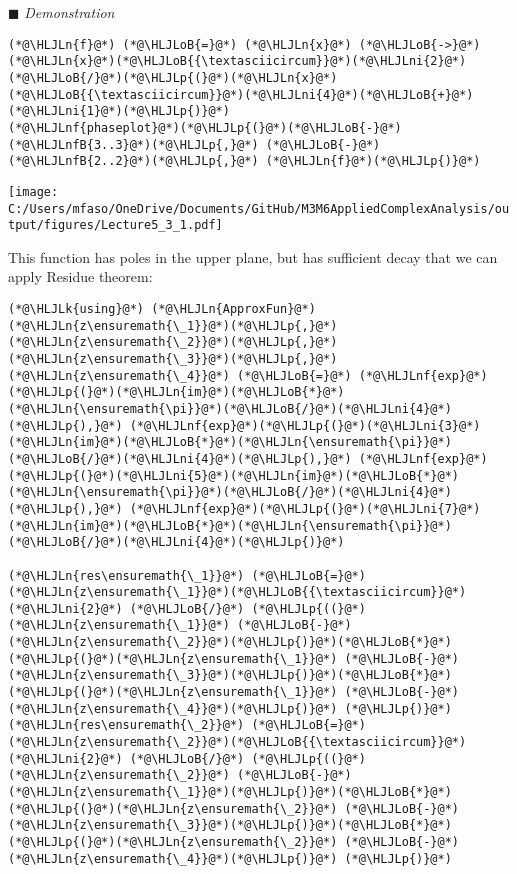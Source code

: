 \documentclass[12pt,landscape]{article}
\newcommand{\HLJLk}[1]{\textcolor[RGB]{148,91,176}{\textbf{#1}}}
\newcommand{\HLJLn}[1]{#1}
\newcommand{\HLJLnf}[1]{\textcolor[RGB]{66,102,213}{#1}}
\newcommand{\HLJLnfB}[1]{\textcolor[RGB]{59,151,46}{#1}}
\newcommand{\HLJLni}[1]{\textcolor[RGB]{59,151,46}{#1}}
\newcommand{\HLJLoB}[1]{\textcolor[RGB]{102,102,102}{\textbf{#1}}}
\newcommand{\HLJLp}[1]{#1}
\def\cent#1{\begin{center}#1\end{center} }
\begin{document}
{\ensuremath{\blacksquare}
\newpage
\emph{Demonstration}


\begin{lstlisting}
(*@\HLJLn{f}@*) (*@\HLJLoB{=}@*) (*@\HLJLn{x}@*) (*@\HLJLoB{->}@*) (*@\HLJLn{x}@*)(*@\HLJLoB{{\textasciicircum}}@*)(*@\HLJLni{2}@*)(*@\HLJLoB{/}@*)(*@\HLJLp{(}@*)(*@\HLJLn{x}@*)(*@\HLJLoB{{\textasciicircum}}@*)(*@\HLJLni{4}@*)(*@\HLJLoB{+}@*)(*@\HLJLni{1}@*)(*@\HLJLp{)}@*)
(*@\HLJLnf{phaseplot}@*)(*@\HLJLp{(}@*)(*@\HLJLoB{-}@*)(*@\HLJLnfB{3..3}@*)(*@\HLJLp{,}@*) (*@\HLJLoB{-}@*)(*@\HLJLnfB{2..2}@*)(*@\HLJLp{,}@*) (*@\HLJLn{f}@*)(*@\HLJLp{)}@*)
\end{lstlisting}

\cent{\texttt{[image: C:/Users/mfaso/OneDrive/Documents/GitHub/M3M6AppliedComplexAnalysis/output/figures/Lecture5\_3\_1.pdf]}}

This function has poles in the upper plane, but has sufficient decay that we can apply Residue theorem:


\begin{lstlisting}
(*@\HLJLk{using}@*) (*@\HLJLn{ApproxFun}@*)
(*@\HLJLn{z\ensuremath{\_1}}@*)(*@\HLJLp{,}@*)(*@\HLJLn{z\ensuremath{\_2}}@*)(*@\HLJLp{,}@*)(*@\HLJLn{z\ensuremath{\_3}}@*)(*@\HLJLp{,}@*)(*@\HLJLn{z\ensuremath{\_4}}@*) (*@\HLJLoB{=}@*) (*@\HLJLnf{exp}@*)(*@\HLJLp{(}@*)(*@\HLJLn{im}@*)(*@\HLJLoB{*}@*)(*@\HLJLn{\ensuremath{\pi}}@*)(*@\HLJLoB{/}@*)(*@\HLJLni{4}@*)(*@\HLJLp{),}@*) (*@\HLJLnf{exp}@*)(*@\HLJLp{(}@*)(*@\HLJLni{3}@*)(*@\HLJLn{im}@*)(*@\HLJLoB{*}@*)(*@\HLJLn{\ensuremath{\pi}}@*)(*@\HLJLoB{/}@*)(*@\HLJLni{4}@*)(*@\HLJLp{),}@*) (*@\HLJLnf{exp}@*)(*@\HLJLp{(}@*)(*@\HLJLni{5}@*)(*@\HLJLn{im}@*)(*@\HLJLoB{*}@*)(*@\HLJLn{\ensuremath{\pi}}@*)(*@\HLJLoB{/}@*)(*@\HLJLni{4}@*)(*@\HLJLp{),}@*) (*@\HLJLnf{exp}@*)(*@\HLJLp{(}@*)(*@\HLJLni{7}@*)(*@\HLJLn{im}@*)(*@\HLJLoB{*}@*)(*@\HLJLn{\ensuremath{\pi}}@*)(*@\HLJLoB{/}@*)(*@\HLJLni{4}@*)(*@\HLJLp{)}@*)

(*@\HLJLn{res\ensuremath{\_1}}@*) (*@\HLJLoB{=}@*) (*@\HLJLn{z\ensuremath{\_1}}@*)(*@\HLJLoB{{\textasciicircum}}@*)(*@\HLJLni{2}@*) (*@\HLJLoB{/}@*) (*@\HLJLp{((}@*)(*@\HLJLn{z\ensuremath{\_1}}@*) (*@\HLJLoB{-}@*) (*@\HLJLn{z\ensuremath{\_2}}@*)(*@\HLJLp{)}@*)(*@\HLJLoB{*}@*)(*@\HLJLp{(}@*)(*@\HLJLn{z\ensuremath{\_1}}@*) (*@\HLJLoB{-}@*) (*@\HLJLn{z\ensuremath{\_3}}@*)(*@\HLJLp{)}@*)(*@\HLJLoB{*}@*)(*@\HLJLp{(}@*)(*@\HLJLn{z\ensuremath{\_1}}@*) (*@\HLJLoB{-}@*) (*@\HLJLn{z\ensuremath{\_4}}@*)(*@\HLJLp{)}@*) (*@\HLJLp{)}@*)
(*@\HLJLn{res\ensuremath{\_2}}@*) (*@\HLJLoB{=}@*) (*@\HLJLn{z\ensuremath{\_2}}@*)(*@\HLJLoB{{\textasciicircum}}@*)(*@\HLJLni{2}@*) (*@\HLJLoB{/}@*) (*@\HLJLp{((}@*)(*@\HLJLn{z\ensuremath{\_2}}@*) (*@\HLJLoB{-}@*) (*@\HLJLn{z\ensuremath{\_1}}@*)(*@\HLJLp{)}@*)(*@\HLJLoB{*}@*)(*@\HLJLp{(}@*)(*@\HLJLn{z\ensuremath{\_2}}@*) (*@\HLJLoB{-}@*) (*@\HLJLn{z\ensuremath{\_3}}@*)(*@\HLJLp{)}@*)(*@\HLJLoB{*}@*)(*@\HLJLp{(}@*)(*@\HLJLn{z\ensuremath{\_2}}@*) (*@\HLJLoB{-}@*) (*@\HLJLn{z\ensuremath{\_4}}@*)(*@\HLJLp{)}@*) (*@\HLJLp{)}@*)


\end{lstlisting}}
\end{document}
